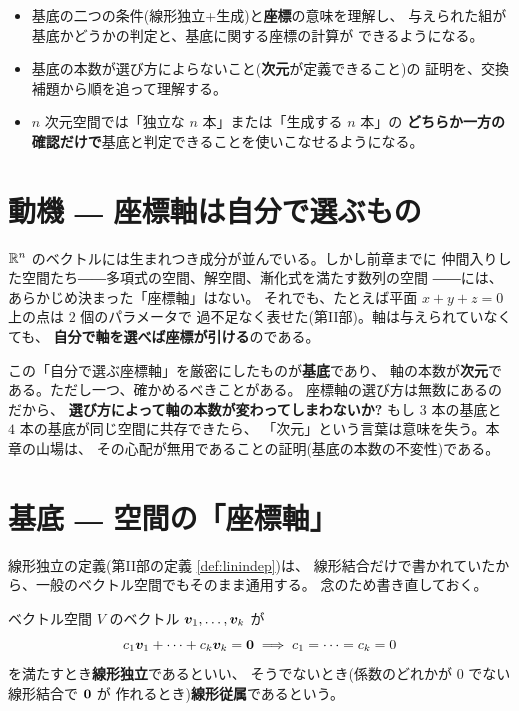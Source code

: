 \begin{goal}
\begin{itemize}
\item 基底の二つの条件(線形独立+生成)と\textbf{座標}の意味を理解し、
与えられた組が基底かどうかの判定と、基底に関する座標の計算が
できるようになる。
\item 基底の本数が選び方によらないこと(\textbf{次元}が定義できること)の
証明を、交換補題から順を追って理解する。
\item $n$ 次元空間では「独立な $n$ 本」または「生成する $n$ 本」の
\textbf{どちらか一方の確認だけで}基底と判定できることを使いこなせるようになる。
\end{itemize}
\end{goal}

\section{動機 ― 座標軸は自分で選ぶもの}

$\mathbb{R}^n$ のベクトルには生まれつき成分が並んでいる。しかし前章までに
仲間入りした空間たち――多項式の空間、解空間、漸化式を満たす数列の空間
――には、あらかじめ決まった「座標軸」はない。
それでも、たとえば平面 $x + y + z = 0$ 上の点は $2$ 個のパラメータで
過不足なく表せた(第II部)。軸は与えられていなくても、
\textbf{自分で軸を選べば座標が引ける}のである。

この「自分で選ぶ座標軸」を厳密にしたものが\textbf{基底}であり、
軸の本数が\textbf{次元}である。ただし一つ、確かめるべきことがある。
座標軸の選び方は無数にあるのだから、
\textbf{選び方によって軸の本数が変わってしまわないか?}
もし $3$ 本の基底と $4$ 本の基底が同じ空間に共存できたら、
「次元」という言葉は意味を失う。本章の山場は、
その心配が無用であることの証明(基底の本数の不変性)である。

\section{基底 ― 空間の「座標軸」}

線形独立の定義(第II部の定義 \ref{def:linindep})は、
線形結合だけで書かれていたから、一般のベクトル空間でもそのまま通用する。
念のため書き直しておく。

\begin{teigi}\label{def:vs-indep}
ベクトル空間 $V$ のベクトル $\bm{v}_1, \dots, \bm{v}_k$ が
\[
c_1\bm{v}_1 + \cdots + c_k\bm{v}_k = \bm{0}
\implies c_1 = \cdots = c_k = 0
\]
を満たすとき\textbf{線形独立}であるといい、
そうでないとき(係数のどれかが $0$ でない線形結合で $\bm{0}$ が
作れるとき)\textbf{線形従属}であるという。
\end{teigi}

